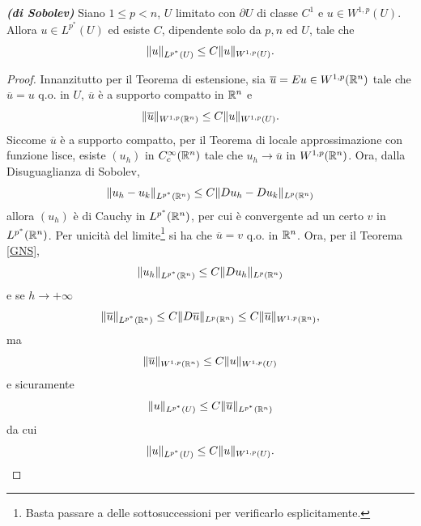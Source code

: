 \begin{teorema}\textbf{\emph{(di Sobolev)}}\label{thdiSobolev}
	Siano $1 \le p < n$, $U$ limitato con $\partial U$ di classe $C^1$ e $u \in W^{1,p}(U)$. Allora $u \in L^{p^\ast}(U)$ ed esiste $C$, dipendente solo da $p,n$ ed $U$, tale che 
	\[ \lVert u\rVert_{L^{p^\ast}(U)} \le C\lVert u\rVert_{W^{1,p}(U)}. \]
\end{teorema}
\begin{proof}
	Innanzitutto per il Teorema di estensione, sia $\overline{u} = Eu \in W^{1,p}(\mathbb{R}^{n})$ tale che $\overline{u} = u$ q.o. in $U$, $\overline{u}$ è a supporto compatto in $\mathbb{R}^n$ e 
	\[ \lVert\overline{u}\rVert_{W^{1,p}(\mathbb{R}^n)} \le C \lVert u\rVert_{W^{1,p}(U)}. \]
	Siccome $\overline{u}$ è a supporto compatto, per il Teorema di locale approssimazione con funzione lisce, esiste $(u_h)$ in $C^\infty_c(\mathbb{R}^n)$ tale che $u_h \to \overline{u}$ in $W^{1,p}(\mathbb{R}^n)$. Ora, dalla Disuguaglianza di Sobolev, 
	\[ \lVert u_h - u_k\rVert_{L^{p^\ast}(\mathbb{R}^n)} \le C\lVert Du_h - Du_k\rVert_{L^p(\mathbb{R}^n)} \]
	allora $(u_h)$ è di Cauchy in $L^{p^\ast}(\mathbb{R}^n)$, per cui è convergente ad un certo $v$ in $L^{p^\ast}(\mathbb{R}^n)$. Per unicità del limite\footnote{Basta passare a delle sottosuccessioni per verificarlo esplicitamente.} si ha che $\overline{u}=v$ q.o. in $\mathbb{R}^n$. Ora, per il Teorema \eqref{GNS},
	\[ \lVert u_h\rVert_{L^{p^\ast}(\mathbb{R}^n)} \le C \lVert Du_h\rVert_{L^p(\mathbb{R}^n)} \]
	e se $h \to +\infty$
	\[ \lVert\overline{u}\rVert_{L^{p^\ast}(\mathbb{R}^n)} \le C \lVert D\overline{u}\rVert_{L^p(\mathbb{R}^n)} \le C\lVert\overline{u}\rVert_{W^{1,p}(\mathbb{R}^n)}, \]
	ma 
	\[ \lVert\overline{u}\rVert_{W^{1,p}(\mathbb{R}^n)} \le C \lVert u\rVert_{W^{1,p}(U)}\]
	e sicuramente
	\[ \lVert u\rVert_{L^{p^\ast}(U)} \le C \lVert\overline{u}\rVert_{L^{p^\ast}(\mathbb{R}^n)} \]
	da cui 
	\[ \lVert u\rVert_{L^{p^\ast}(U)} \le C\lVert u\rVert_{W^{1,p}(U)}.\qedhere \]
\end{proof}

